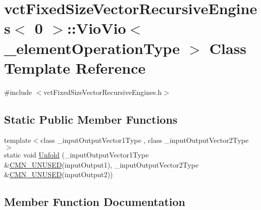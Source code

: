 \hypertarget{classvct_fixed_size_vector_recursive_engines_3_010_01_4_1_1_vio_vio}{}\section{vct\+Fixed\+Size\+Vector\+Recursive\+Engines$<$ 0 $>$\+:\+:Vio\+Vio$<$ \+\_\+element\+Operation\+Type $>$ Class Template Reference}
\label{classvct_fixed_size_vector_recursive_engines_3_010_01_4_1_1_vio_vio}


{\ttfamily \#include $<$vct\+Fixed\+Size\+Vector\+Recursive\+Engines.\+h$>$}

\subsection*{Static Public Member Functions}
\begin{DoxyCompactItemize}
\item 
{\footnotesize template$<$class \+\_\+input\+Output\+Vector1\+Type , class \+\_\+input\+Output\+Vector2\+Type $>$ }\\static void \hyperlink{classvct_fixed_size_vector_recursive_engines_3_010_01_4_1_1_vio_vio_ab4e34c3396a64e443eb6d518a8950ece}{Unfold} (\+\_\+input\+Output\+Vector1\+Type \&\hyperlink{cmn_portability_8h_a021894e2626935fa2305434b1e893ff6}{C\+M\+N\+\_\+\+U\+N\+U\+S\+E\+D}(input\+Output1), \+\_\+input\+Output\+Vector2\+Type \&\hyperlink{cmn_portability_8h_a021894e2626935fa2305434b1e893ff6}{C\+M\+N\+\_\+\+U\+N\+U\+S\+E\+D}(input\+Output2))
\end{DoxyCompactItemize}


\subsection{Member Function Documentation}
\hypertarget{classvct_fixed_size_vector_recursive_engines_3_010_01_4_1_1_vio_vio_ab4e34c3396a64e443eb6d518a8950ece}{}
